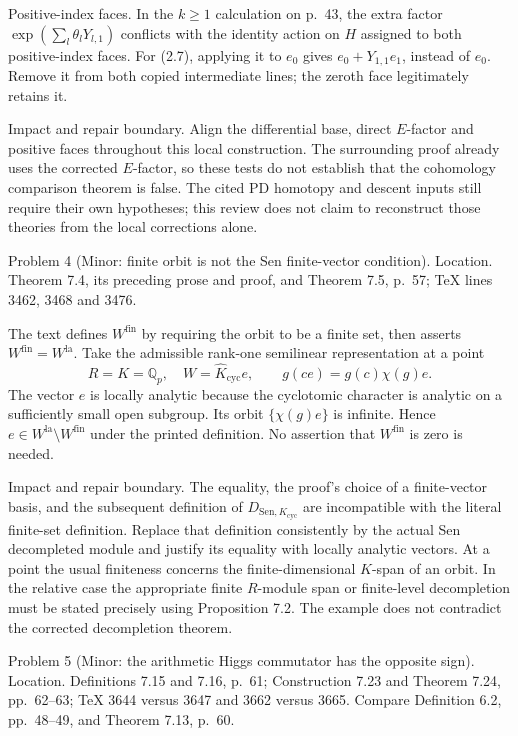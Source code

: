 \documentclass[10pt]{article}
\begin{document}
Positive-index faces. In the \(k\ge1\) calculation on p. 43, the extra factor \(\exp(\sum_l\theta_lY_{l,1})\) conflicts with the identity action on \(H\) assigned to both positive-index faces. For (2.7), applying it to \(e_0\) gives \(e_0+Y_{1,1}e_1\), instead of \(e_0\). Remove it from both copied intermediate lines; the zeroth face legitimately retains it.\par
Impact and repair boundary. Align the differential base, direct \(E\)-factor and positive faces throughout this local construction. The surrounding proof already uses the corrected \(E\)-factor, so these tests do not establish that the cohomology comparison theorem is false. The cited PD homotopy and descent inputs still require their own hypotheses; this review does not claim to reconstruct those theories from the local corrections alone.\par
Problem 4 (Minor: finite orbit is not the Sen finite-vector condition).  Location. Theorem 7.4, its preceding prose and proof, and Theorem 7.5, p. 57; TeX lines 3462, 3468 and 3476.\par
The text defines \(W^{\mathrm{fin}}\) by requiring the orbit to be a finite set, then asserts \(W^{\mathrm{fin}}=W^{\mathrm{la}}\). Take the admissible rank-one semilinear representation at a point \[R=K=\mathbb Q_p,\quad W=\widehat K_{\mathrm{cyc}}e,\qquad
 g(ce)=g(c)\chi(g)e.
 \tag{2.9}\] The vector \(e\) is locally analytic because the cyclotomic character is analytic on a sufficiently small open subgroup. Its orbit \(\{\chi(g)e\}\) is infinite. Hence \(e\in W^{\mathrm{la}}\setminus W^{\mathrm{fin}}\) under the printed definition. No assertion that \(W^{\mathrm{fin}}\) is zero is needed.\par
Impact and repair boundary. The equality, the proof’s choice of a finite-vector basis, and the subsequent definition of \(D_{\mathrm{Sen},K_{\mathrm{cyc}}}\) are incompatible with the literal finite-set definition. Replace that definition consistently by the actual Sen decompleted module and justify its equality with locally analytic vectors. At a point the usual finiteness concerns the finite-dimensional \(K\)-span of an orbit. In the relative case the appropriate finite \(R\)-module span or finite-level decompletion must be stated precisely using Proposition 7.2. The example does not contradict the corrected decompletion theorem.\par
Problem 5 (Minor: the arithmetic Higgs commutator has the opposite sign).  Location. Definitions 7.15 and 7.16, p. 61; Construction 7.23 and Theorem 7.24, pp. 62–63; TeX 3644 versus 3647 and 3662 versus 3665. Compare Definition 6.2, pp. 48–49, and Theorem 7.13, p. 60.\par
\end{document}
